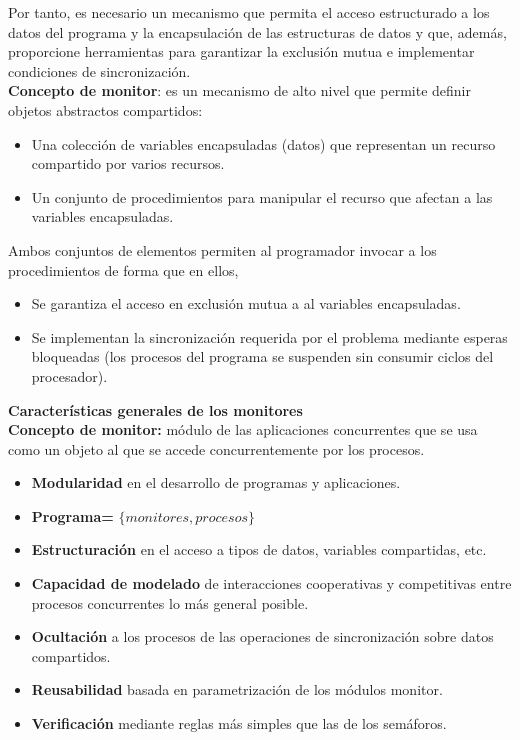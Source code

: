 \documentclass[a4paper,11pt]{article}
\begin{document}
Por tanto, es necesario un mecanismo que permita el acceso estructurado a los datos del programa y la encapsulación de las estructuras de datos y que, además, proporcione herramientas para garantizar la exclusión mutua e implementar condiciones de sincronización. \\

\textbf{Concepto de monitor}: es un mecanismo de alto nivel que permite definir objetos abstractos compartidos:

\begin{itemize}
\item Una colección de variables encapsuladas (datos) que representan un recurso compartido por varios recursos.

\item Un conjunto de procedimientos para manipular el recurso que afectan a las variables encapsuladas.
\end{itemize}

Ambos conjuntos de elementos permiten al programador invocar a los procedimientos de forma que en ellos,

\begin{itemize}
\item Se garantiza el acceso en exclusión mutua a al variables encapsuladas.

\item Se implementan la sincronización requerida por el problema mediante esperas bloqueadas (los procesos del programa se suspenden sin consumir ciclos del procesador). 
\end{itemize}

\textbf{Características generales de los monitores} \\

\textbf{Concepto de monitor:} módulo de las aplicaciones concurrentes que se usa como un objeto al que se accede concurrentemente por los procesos.

\begin{itemize}
\item \textbf{Modularidad} en el desarrollo de programas y aplicaciones.
\item \textbf{Programa= }$\{monitores,procesos\}$
\item \textbf{Estructuración} en el acceso a tipos de datos, variables compartidas, etc.
\item \textbf{Capacidad de modelado} de interacciones cooperativas y competitivas entre procesos concurrentes lo más general posible.
\item \textbf{Ocultación} a los procesos de las operaciones de sincronización sobre datos compartidos.
\item \textbf{Reusabilidad} basada en parametrización de los módulos monitor.
\item \textbf{Verificación} mediante reglas más simples que las de los semáforos.
\end{itemize}
\end{document}
